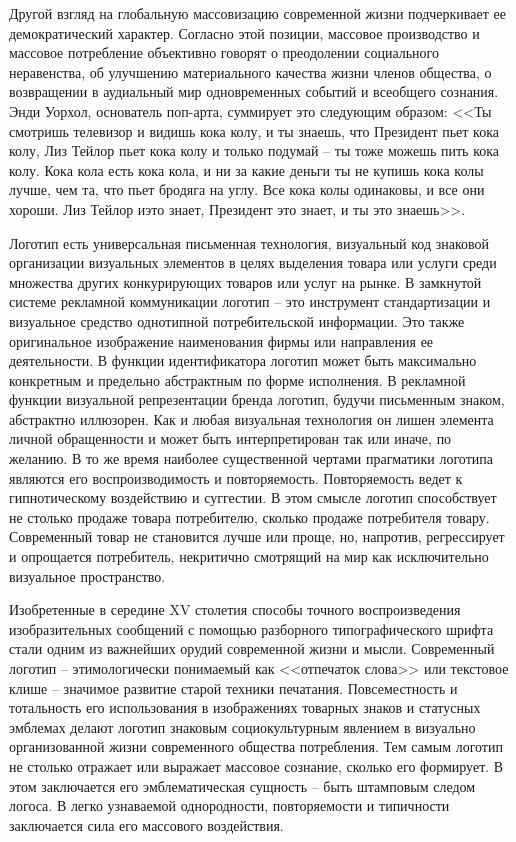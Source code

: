 Другой взгляд на глобальную массовизацию современной жизни подчеркивает ее демократический
характер. Согласно этой позиции, массовое производство и массовое потребление объективно говорят о
преодолении социального неравенства, об улучшению материального качества жизни членов общества, о
возвращении в аудиальный мир одновременных событий и всеобщего сознания. Энди Уорхол, основатель
поп-арта, суммирует это следующим образом: <<Ты смотришь телевизор и видишь кока колу, и ты знаешь,
что Президент пьет кока колу, Лиз Тейлор пьет кока колу и только подумай -- ты тоже можешь пить кока
колу. Кока кола есть кока кола, и ни за какие деньги ты не купишь кока колы лучше, чем та, что пьет
бродяга на углу. Все кока колы одинаковы, и все они хороши. Лиз Тейлор иэто знает, Президент это
знает, и ты это знаешь>>. \autocite[][]{warhol2002}  %

Логотип есть универсальная письменная технология, визуальный код знаковой организации визуальных
элементов в целях выделения товара или услуги среди множества других конкурирующих товаров или услуг
на рынке. В замкнутой системе рекламной коммуникации логотип -- это инструмент стандартизации и
визуальное средство однотипной потребительской информации. Это также оригинальное изображение
наименования фирмы или направления ее деятельности. В функции идентификатора логотип может быть
максимально конкретным и предельно абстрактным по форме исполнения. В рекламной функции визуальной
репрезентации бренда логотип, будучи письменным знаком, абстрактно иллюзорен. Как и любая визуальная
технология он лишен элемента личной обращенности и может быть интерпретирован так или иначе, по
желанию. В то же время наиболее существенной чертами прагматики логотипа являются его
воспроизводимость и повторяемость. Повторяемость ведет к гипнотическому воздействию и
суггестии. В этом смысле логотип способствует не столько продаже товара потребителю, сколько
продаже потребителя товару. Современный товар не становится лучше или проще, но, напротив,
регрессирует и опрощается потребитель, некритично смотрящий на мир как исключительно визуальное
пространство.

Изобретенные в середине XV столетия способы точного воспроизведения изобразительных сообщений с
помощью разборного типографического шрифта стали одним из важнейших орудий современной жизни и
мысли. Современный логотип -- этимологически  понимаемый как <<отпечаток слова>>  или текстовое
клише -- значимое развитие старой техники печатания. Повсеместность и тотальность его использования
в изображениях товарных знаков и статусных эмблемах  делают логотип знаковым социокультурным
явлением в визуально организованной жизни современного общества потребления. Тем самым логотип не
столько отражает или выражает массовое сознание, сколько его формирует.  В этом заключается его
эмблематическая сущность -- быть штамповым следом логоса. В легко узнаваемой однородности,
повторяемости и типичности заключается сила его массового воздействия.

